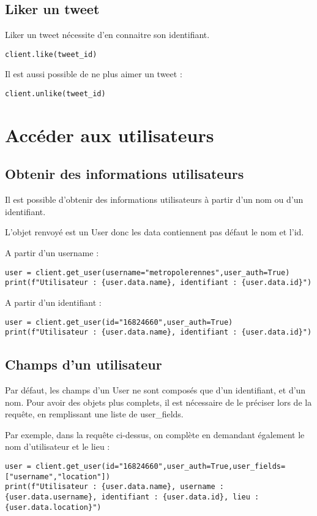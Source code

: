 \documentclass[11pt,a4paper]{article}
\begin{document}
\subsection{Liker un tweet}
Liker un tweet nécessite d'en connaitre son identifiant. 
\begin{lstlisting}
client.like(tweet_id)
\end{lstlisting}

Il est aussi possible de ne plus aimer un tweet : 
\begin{lstlisting}
client.unlike(tweet_id)
\end{lstlisting}
\section{Accéder aux utilisateurs}

\subsection{Obtenir des informations utilisateurs}

Il est possible d'obtenir des informations utilisateurs à partir d'un nom ou d'un identifiant.

L'objet renvoyé est un User donc les data contiennent pas défaut le nom et l'id.

A partir d'un username : 
\begin{lstlisting}
user = client.get_user(username="metropolerennes",user_auth=True)
print(f"Utilisateur : {user.data.name}, identifiant : {user.data.id}")
\end{lstlisting}

A partir d'un identifiant : 

\begin{lstlisting}
user = client.get_user(id="16824660",user_auth=True)
print(f"Utilisateur : {user.data.name}, identifiant : {user.data.id}")
\end{lstlisting}

\subsection{Champs d'un utilisateur}
Par défaut, les champs d'un User ne sont composés que d'un identifiant, et d'un nom. Pour avoir des objets plus complets, il est nécessaire de le préciser lors de la requête, en remplissant une liste de user\_fields.

Par exemple, dans la requête ci-dessus, on complète en demandant également le nom d'utilisateur et le lieu : 
\begin{lstlisting}
user = client.get_user(id="16824660",user_auth=True,user_fields=["username","location"])
print(f"Utilisateur : {user.data.name}, username :{user.data.username}, identifiant : {user.data.id}, lieu : {user.data.location}")
\end{lstlisting}
\end{document}

